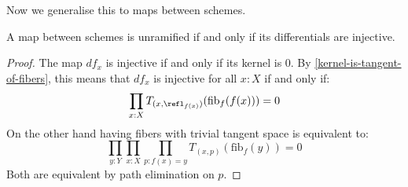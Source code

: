 Now we generalise this to maps between schemes.

\begin{proposition}\label{unramified-map-characterisation}
A map between schemes is unramified if and only if its differentials are injective. 
\end{proposition}

\begin{proof}
The map $df_x$ is injective if and only if its kernel is $0$. By \cref{kernel-is-tangent-of-fibers}, this means that $df_x$ is injective for all $x:X$ if and only if:
\[
\prod_{x:X}T_{(x,\refl_{f(x)})}(\mathrm{fib}_f(f(x)))=0
\]
On the other hand having fibers with trivial tangent space is equivalent to:
\[
\prod_{y:Y}\prod_{x:X}\prod_{p:f(x)=y} T_{(x,p)}(\mathrm{fib}_f(y)) = 0
\]
Both are equivalent by path elimination on $p$.
\end{proof}
